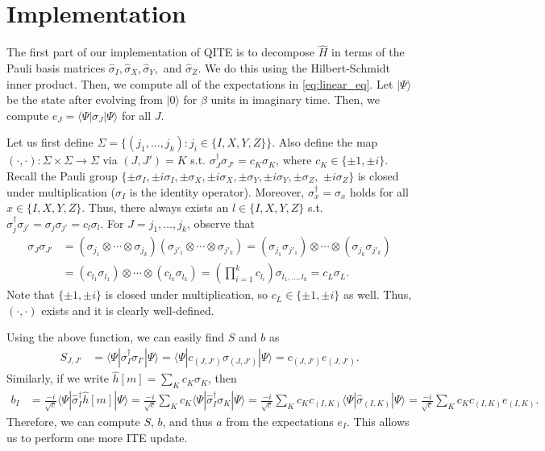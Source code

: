 \documentclass{article}
\begin{document}
\section{Implementation}
The first part of our implementation of QITE is to decompose $\hat{H}$ in terms of the Pauli basis matrices $\hat{\sigma}_I, \hat{\sigma}_X, \hat{\sigma}_Y,$ and $\hat{\sigma}_Z$.
We do this using the Hilbert-Schmidt inner product.
Then, we compute all of the expectations in \cref{eq:linear_eq}.
Let $| \Psi \rangle$ be the state after evolving from $| 0 \rangle$ for $\beta$ units in imaginary time.
Then, we compute $e_J = \langle \Psi | \sigma_J | \Psi \rangle$ for all $J$.

Let us first define $\Sigma = \{(j_1,\ldots,j_k) : j_i \in \{I,X,Y,Z\} \}$.
Also define the map $(\cdot,\cdot) : \Sigma \times \Sigma \to \Sigma$ via $(J,J') = K$ s.t. $\sigma_J^\dagger \sigma_{J'} = c_K \sigma_K$, where $c_K \in \{\pm 1, \pm i\}$.
Recall the Pauli group $\{ \pm \sigma_I, \pm i \sigma_I, \pm \sigma_X, \pm i \sigma_X, \pm \sigma_Y, \pm i \sigma_Y, \pm \sigma_Z,$ $\pm i \sigma_Z \}$ is closed under multiplication ($\sigma_I$ is the identity operator).
Moreover, $\sigma_x^\dagger = \sigma_x$ holds for all $x \in \{I, X, Y, Z\}$.
Thus, there always exists an $l \in \{I,X,Y,Z\}$ s.t. $\sigma_j^\dagger \sigma_{j'} = \sigma_j \sigma_{j'} = c_l \sigma_l$.
For $J = j_1, \ldots, j_k$, observe that
\begin{align*}
    \sigma_J \sigma_{J'}
    &= (\sigma_{j_1} \otimes \cdots \otimes \sigma_{j_k}) (\sigma_{j'_1} \otimes \cdots \otimes \sigma_{j'_k})
    = (\sigma_{j_1} \sigma_{j'_1}) \otimes \cdots \otimes (\sigma_{j_k} \sigma_{j'_k}) \\
    &= (c_{l_1} \sigma_{l_1}) \otimes \cdots \otimes (c_{l_k} \sigma_{l_k})
    = \left( \prod_{i=1}^{k} c_{l_i} \right) \sigma_{l_1,\ldots,l_k}
    = c_L \sigma_L.
\end{align*}
Note that $\{\pm 1, \pm i\}$ is closed under multiplication, so $c_L \in \{\pm 1, \pm i\}$ as well.
Thus, $(\cdot,\cdot)$ exists and it is clearly well-defined.

Using the above function, we can easily find $S$ and $b$ as 
\begin{align}
    S_{J,J'}
    &= \langle \Psi | \sigma_I^\dagger \sigma_{I'} | \Psi \rangle
    = \langle \Psi | c_{(J,J')} \sigma_{(J,J')} | \Psi \rangle
    = c_{(J,J')} e_{(J,J')}.
\end{align}
Similarly, if we write $\hat{h}[m] = \sum_K c_K \sigma_K$, then
\begin{align}
    b_I &= \frac{-i}{\sqrt{c}} \langle \Psi | \hat{\sigma}_I^\dagger \hat{h}[m] | \Psi \rangle
    = \frac{-i}{\sqrt{c}} \sum_K c_K \langle \Psi | \hat{\sigma}_I^\dagger \sigma_K | \Psi \rangle
    = \frac{-i}{\sqrt{c}} \sum_K c_K c_{(I,K)} \langle \Psi | \hat{\sigma}_{(I,K)} | \Psi \rangle
    = \frac{-i}{\sqrt{c}} \sum_K c_K c_{(I,K)} e_{(I,K)}.
\end{align}
Therefore, we can compute $S$, $b$, and thus $a$ from the expectations $e_I$.
This allows us to perform one more ITE update.
\end{document}
